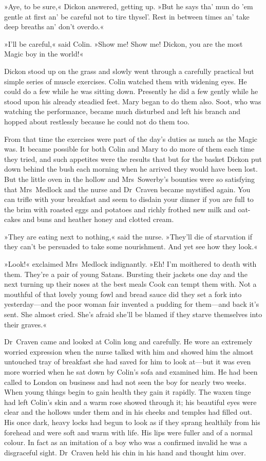 »Aye, to be sure,« Dickon answered, getting up. »But he says tha' mun do 'em gentle at first an' be careful not to tire thysel'. Rest in between times an' take deep breaths an' don't overdo.«

»I'll be careful,« said Colin. »Show me! Show me! Dickon, you are the most Magic boy in the world!«

Dickon stood up on the grass and slowly went through a carefully practical but simple series of muscle exercises. Colin watched them with widening eyes. He could do a few while he was sitting down. Presently he did a few gently while he stood upon his already steadied feet. Mary began to do them also. Soot, who was watching the performance, became much disturbed and left his branch and hopped about restlessly because he could not do them too.

From that time the exercises were part of the day's duties as much as the Magic was. It became possible for both Colin and Mary to do more of them each time they tried, and such appetites were the results that but for the basket Dickon put down behind the bush each morning when he arrived they would have been lost. But the little oven in the hollow and Mrs~Sowerby's bounties were so satisfying that Mrs~Medlock and the nurse and Dr~Craven became mystified again. You can trifle with your breakfast and seem to disdain your dinner if you are full to the brim with roasted eggs and potatoes and richly frothed new milk and oat-cakes and buns and heather honey and clotted cream.

»They are eating next to nothing,« said the nurse. »They'll die of starvation if they can't be persuaded to take some nourishment. And yet see how they look.«

»Look!« exclaimed Mrs~Medlock indignantly. »Eh! I'm moithered to death with them. They're a pair of young Satans. Bursting their jackets one day and the next turning up their noses at the best meals Cook can tempt them with. Not a mouthful of that lovely young fowl and bread sauce did they set a fork into yesterday—and the poor woman fair invented a pudding for them—and back it's sent. She almost cried. She's afraid she'll be blamed if they starve themselves into their graves.«

Dr~Craven came and looked at Colin long and carefully. He wore an extremely worried expression when the nurse talked with him and showed him the almost untouched tray of breakfast she had saved for him to look at—but it was even more worried when he sat down by Colin's sofa and examined him. He had been called to London on business and had not seen the boy for nearly two weeks. When young things begin to gain health they gain it rapidly. The waxen tinge had left Colin's skin and a warm rose showed through it; his beautiful eyes were clear and the hollows under them and in his cheeks and temples had filled out. His once dark, heavy locks had begun to look as if they sprang healthily from his forehead and were soft and warm with life. His lips were fuller and of a normal colour. In fact as an imitation of a boy who was a confirmed invalid he was a disgraceful sight. Dr~Craven held his chin in his hand and thought him over.

